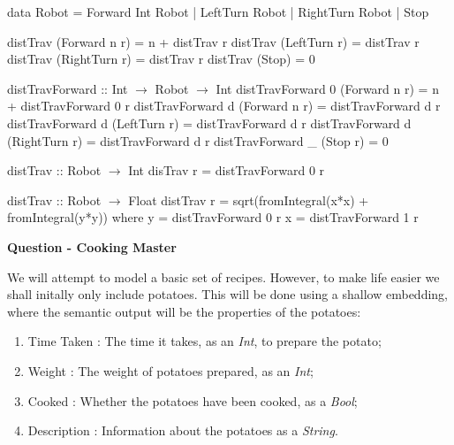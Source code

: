 \documentclass[11pt,a4paper]{article}
\begin{document}
\codesol
\ifsolutions
\begin{code}
data Robot = Forward Int Robot
           | LeftTurn Robot
           | RightTurn Robot
           | Stop
\end{code}
\fi


\codesol
\ifsolutions
\begin{code}
  distTrav (Forward n r) = n + distTrav r
  distTrav (LeftTurn r)  = distTrav r
  distTrav (RightTurn r) = distTrav r
  distTrav (Stop)        = 0
\end{code}
\fi


\codesol
\ifsolutions
\begin{code}
distTravForward :: Int $\to$ Robot $\to$ Int
distTravForward 0 (Forward n r) = n + distTravForward 0 r
distTravForward d (Forward n r) = distTravForward d r
distTravForward d (LeftTurn r) = distTravForward d r
distTravForward d (RightTurn r) = distTravForward d r
distTravForward _ (Stop r) = 0

distTrav :: Robot $\to$ Int
disTrav r = distTravForward 0 r
\end{code}
\fi


\codesol
\ifsolutions
\begin{code}
distTrav :: Robot $\to$ Float
distTrav r = sqrt(fromIntegral(x*x) + fromIntegral(y*y))
  where
    y = distTravForward 0 r
    x = distTravForward 1 r
\end{code}
\fi

\newquestion \ifquestions \textbf{Question  - Cooking Master}{
We will attempt to model a basic set of recipes. However, to make life easier we shall initally only include potatoes. This will be done using a shallow embedding, where the semantic output will be the properties of the potatoes:
\begin{enumerate}[label=\roman*)]
  \item Time Taken : The time it takes, as an \textit{Int}, to prepare the potato;
  \item Weight : The weight of potatoes prepared, as an \textit{Int};
  \item Cooked : Whether the potatoes have been cooked, as a \textit{Bool};
  \item Description : Information about the potatoes as a \textit{String}.
\end{enumerate}
}
\fi
\end{document}
